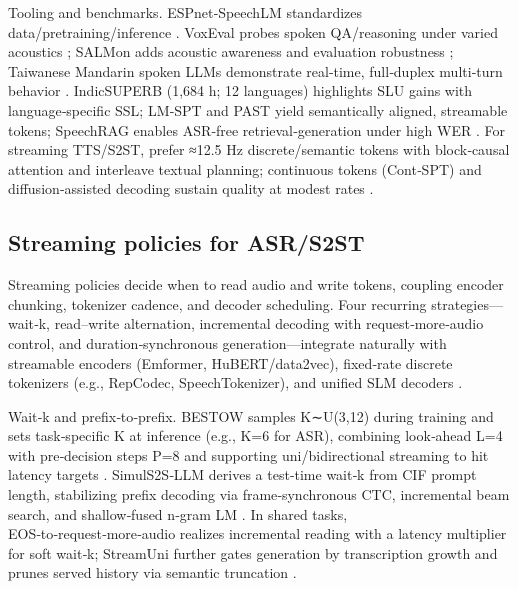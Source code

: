 \documentclass{article}
\begin{document}
Tooling and benchmarks. ESPnet‑SpeechLM standardizes data/pretraining/inference \cite{tian2025espnetspeechlmopenspeechlanguagemodeltoo}. VoxEval probes spoken QA/reasoning under varied acoustics \cite{cui2025voxevalbenchmarkingknowledgeunderstandin}; SALMon adds acoustic awareness and evaluation robustness \cite{maimon2025salmonsuiteacousticlanguagemodelevaluati}; Taiwanese Mandarin spoken LLMs demonstrate real‑time, full‑duplex multi‑turn behavior \cite{yang2024buildingtaiwanesemandarinspokenlanguagem}. IndicSUPERB (1,684 h; 12 languages) highlights SLU gains with language‑specific SSL; LM‑SPT and PAST yield semantically aligned, streamable tokens; SpeechRAG enables ASR‑free retrieval‑generation under high WER \cite{entry2025indicsuperbspeechprocessinguniversalperf,jo2025lmsptalignedsemanticdistillationspeechto,har-tuv2025pastphoneticacousticspeechtokenizer,min2025speechretrievalaugmentedgenerationwithou}. For streaming TTS/S2ST, prefer ≈12.5 Hz discrete/semantic tokens with block‑causal attention and interleave textual planning; continuous tokens (Cont‑SPT) and diffusion‑assisted decoding sustain quality at modest rates \cite{li2025continuousspeechtokenizertext,bai2025dmelspeechtokenizationmadesimple,zhao2024textlessstreamingspeechtranslationsemant,yang2025diffsoundstreamefficientspeechtokenizati}.



\subsection{Streaming policies for ASR/S2ST} \label{subsec:Streaming policies for ASR/S2ST}

Streaming policies decide when to read audio and write tokens, coupling encoder chunking, tokenizer cadence, and decoder scheduling. Four recurring strategies—wait‑k, read–write alternation, incremental decoding with request‑more‑audio control, and duration‑synchronous generation—integrate naturally with streamable encoders (Emformer, HuBERT/data2vec), fixed‑rate discrete tokenizers (e.g., RepCodec, SpeechTokenizer), and unified SLM decoders \cite{huang2024repcodecspeechrepresentationcodectokeniz,zhang2024speechtokenizerunifiedspeechtokenizerlar}.

Wait‑k and prefix‑to‑prefix. BESTOW samples K∼U(3,12) during training and sets task‑specific K at inference (e.g., K=6 for ASR), combining look‑ahead L=4 with pre‑decision steps P=8 and supporting uni/bidirectional streaming to hit latency targets \cite{chen2024bestowefficientstreamablespeechlanguagem}. SimulS2S‑LLM derives a test‑time wait‑k from CIF prompt length, stabilizing prefix decoding via frame‑synchronous CTC, incremental beam search, and shallow‑fused n‑gram LM \cite{deng2025simuls2sllmunlockingsimultaneousinferenc}. In shared tasks, EOS‑to‑request‑more‑audio realizes incremental reading with a latency multiplier for soft wait‑k; StreamUni further gates generation by transcription growth and prunes served history via semantic truncation \cite{ouyang2025cmusiwslt2025simultaneousspeechtranslati,guo2025streamuniachievingstreamingspeechtransla}.
\end{document}
